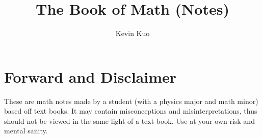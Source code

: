 \documentclass[12pt, english]{book}
\begin{document}
	\title{The Book of Math (Notes)}
	\author{Kevin Kuo}
	
	\pagestyle{fancy}
	\fancyhead{} %
	\fancyhead[LO]{  }
	\fancyhead[CO]{  }
	\fancyhead[RO]{  }
	\renewcommand{\headrulewidth}{0pt}
	
	\fancyfoot{} %
	\fancyfoot[LO]{}
	\fancyfoot[CO]{\thepage}
	\fancyfoot[RO]{}
	\renewcommand{\footrulewidth}{0pt}
	\vspace{0cm}	
	
	\frontmatter
	
	\maketitle
	
	\newpage
	\section*{Forward and Disclaimer}
	These are math notes made by a student (with a physics major and math minor) based off text books. It may contain misconceptions and misinterpretations, thus should not be viewed in the same light of a text book. Use at your own risk and mental sanity.
	
\end{document}
